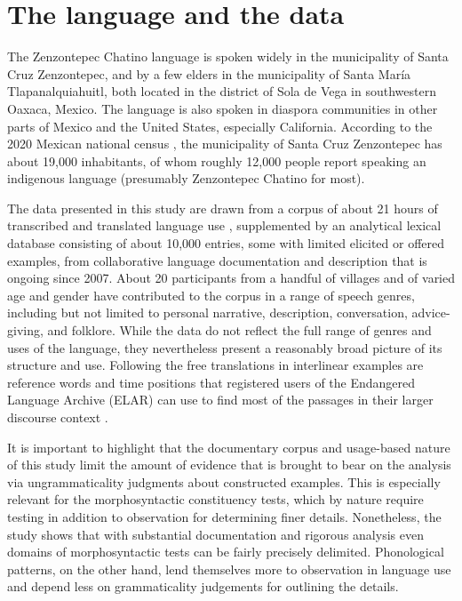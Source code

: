 \documentclass[output=paper]{langscibook}
\begin{document}
\largerpage
\section{The language and the data}
\label{bkm:Ref90318129}
The Zenzontepec Chatino language is spoken widely in the municipality of Santa Cruz Zenzontepec, and by a few elders in the municipality of Santa María Tlapanalquiahuitl, both located in the district of Sola de Vega in southwestern Oaxaca, Mexico. The language is also spoken in diaspora communities in other parts of Mexico and the United States, especially California. According to the 2020 Mexican national census \citep{INEGI2020}, the municipality of Santa Cruz Zenzontepec has about 19,000 inhabitants, of whom roughly 12,000 people report speaking an indigenous language (presumably Zenzontepec Chatino for most).

The data presented in this study are drawn from a corpus of about 21 hours of transcribed and translated language use \citep{Campbell2012}, supplemented by an analytical lexical database consisting of about 10,000 entries, some with limited elicited or offered examples, from collaborative language documentation and description that is ongoing since 2007. About 20 participants from a handful of villages and of varied age and gender have contributed to the corpus in a range of speech genres, including but not limited to personal narrative, description, conversation, advice-giving, and folklore. While the data do not reflect the full range of genres and uses of the language, they nevertheless present a reasonably broad picture of its structure and use. Following the free translations in interlinear examples are reference words and time positions that registered users of the Endangered Language Archive (ELAR) can use to find most of the passages in their larger discourse context \citep{Campbell2012}.


It is important to highlight that the documentary corpus and usage-based nature of this study limit the amount of evidence that is brought to bear on the analysis via ungrammaticality judgments about constructed examples. This is especially relevant for the morphosyntactic constituency tests, which by nature require testing in addition to observation for determining finer details. Nonetheless, the study shows that with substantial documentation and rigorous analysis even domains of morphosyntactic tests can be fairly precisely delimited. Phonological patterns, on the other hand, lend themselves more to observation in language use and depend less on grammaticality judgements for outlining the details.
\end{document}

